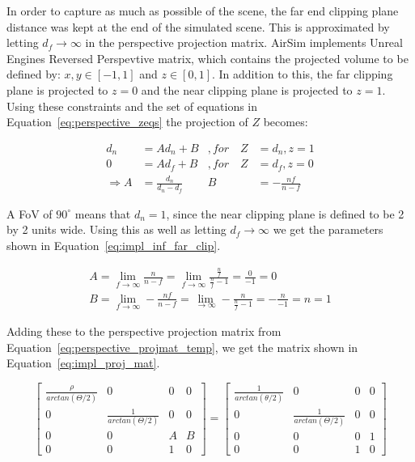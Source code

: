 In order to capture as much as possible of the scene, the far end clipping plane distance was kept at the end of the simulated scene. This is approximated by letting $d_f \rightarrow \infty$ in the perspective projection matrix. AirSim implements Unreal Engines Reversed Perspevtive matrix, which contains the projected volume to be defined by: $x,y \in [-1,1]$ and $z \in [0,1]$. In addition to this, the far clipping plane is projected to $z=0$ and the near clipping plane is projected to $z=1$. Using these constraints and the set of equations in Equation~\eqref{eq:perspective_zeqs} the projection of $Z$ becomes:

\begin{equation}
    \begin{aligned}
        d_n &= Ad_n + B &, for \quad Z &= d_n, z = 1 \\
        0 &= Ad_f + B &, for \quad Z &= d_f, z = 0 \\
        \Rightarrow A &= \frac{d_n}{d_n-d_f} & B &= -\frac{nf}{n-f}
    \end{aligned}
    \label{eq:impl_perspective_zeqs}
\end{equation}

A FoV of $90^\circ$ means that $d_n=1$, since the near clipping plane is defined to be 2 by 2 units wide. Using this as well as letting $d_f \rightarrow \infty$ we get the parameters shown in Equation~\eqref{eq:impl_inf_far_clip}.

\begin{equation}
    \begin{aligned}
    A = \lim_{f \rightarrow \infty} \frac{n}{n-f} =
    \lim_{f \rightarrow \infty} \frac{\frac{n}{f}}{\frac{n}{f}-1} = 
    \frac{0}{-1} = 0 \\
    B = \lim_{f \rightarrow \infty} -\frac{nf}{n-f} = 
    \lim_{ \rightarrow \infty} -\frac{n}{\frac{n}{f}-1} =
    -\frac{n}{-1} = n = 1
    \end{aligned}
    \label{eq:impl_inf_far_clip}
\end{equation}

Adding these to the perspective projection matrix from Equation~\eqref{eq:perspective_projmat_temp}, we get the matrix shown in Equation~\eqref{eq:impl_proj_mat}.

\begin{equation}
    \begin{bmatrix}
        \frac{\rho}{arctan(\Theta/2)} & 0 & 0 & 0 \\
        0 & \frac{1}{arctan(\Theta/2)} & 0 & 0 \\
        0 & 0 & A & B \\
        0 & 0 & 1 & 0 
    \end{bmatrix} = \begin{bmatrix}
        \frac{1}{arctan(\theta/2)} & 0 & 0 & 0 \\
        0 & \frac{1}{arctan(\Theta/2)} & 0 & 0 \\
        0 & 0 & 0 & 1 \\
        0 & 0 & 1 & 0 
    \end{bmatrix}
    \label{eq:impl_proj_mat}
\end{equation}

